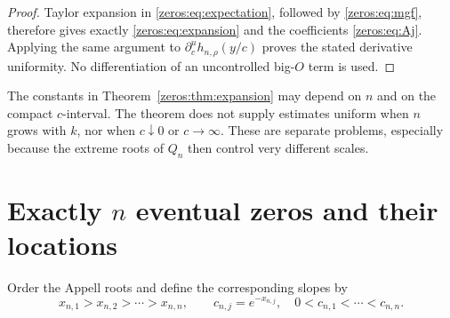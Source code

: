 \begin{proof}
Taylor expansion in \eqref{zeros:eq:expectation}, followed by \eqref{zeros:eq:mgf}, therefore gives exactly \eqref{zeros:eq:expansion} and the coefficients \eqref{zeros:eq:Aj}. Applying the same argument to $\partial_c^u h_{n,\rho}(y/c)$ proves the stated derivative uniformity. No differentiation of an uncontrolled big-$O$ term is used.
\end{proof}

\begin{remark}
The constants in Theorem~\ref{zeros:thm:expansion} may depend on $n$ and on the compact $c$-interval. The theorem does not supply estimates uniform when $n$ grows with $k$, nor when $c\downarrow0$ or $c\to\infty$. These are separate problems, especially because the extreme roots of $Q_n$ then control very different scales.
\end{remark}

\section{Exactly \texorpdfstring{$n$}{n} eventual zeros and their locations}
\label{zeros:sec:zerolocations}

Order the Appell roots and define the corresponding slopes by
\begin{equation}\label{zeros:eq:slopes}
 x_{n,1}>x_{n,2}>\cdots>x_{n,n},\qquad
 c_{n,j}=e^{-x_{n,j}},
 \quad 0<c_{n,1}<\cdots<c_{n,n}.
\end{equation}

